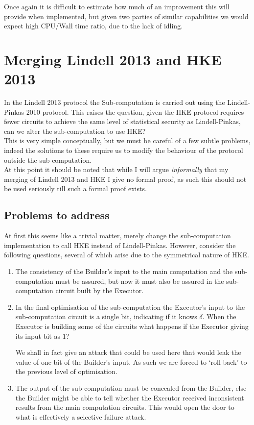 \documentclass[ %
                    author={Nicholas Tutte},
                supervisor={Prof. Nigel Smart},
                    degree={MEng},
                     title={Secure Two Party Computation},
                  subtitle={A practical comparison of recent protocols},
                      type={Research - GG1K},
                      year={2015} ]{dissertation}
\begin{document}
				Once again it is difficult to estimate how much of an improvement this will provide when implemented, but given two parties of similar capabilities we would expect high CPU/Wall time ratio, due to the lack of idling.


		\section{Merging Lindell 2013 and HKE 2013}
			In the Lindell 2013 protocol the Sub-computation is carried out using the Lindell-Pinkas 2010 protocol. This raises the question, given the HKE protocol requires fewer circuits to achieve the same level of statistical security as Lindell-Pinkas, can we alter the sub-computation to use HKE?\\

			This is very simple conceptually, but we must be careful of a few subtle problems, indeed the solutions to these require us to modify the behaviour of the protocol outside the sub-computation.\\

			At this point it should be noted that while I will argue \emph{informally} that my merging of Lindell 2013 and HKE I give no formal proof, as such this should not be used seriously till such a formal proof exists.

			\subsection{Problems to address}
				At first this seems like a trivial matter, merely change the sub-computation implementation to call HKE instead of Lindell-Pinkas. However, consider the following questions, several of which arise due to the symmetrical nature of HKE.

				\begin{enumerate}
					\item The consistency of the Builder's input to the main computation and the sub-computation must be assured, but now it must also be assured in the sub-computation circuit built by the Executor.

					\item In the final optimisation of the sub-computation the Executor's input to the sub-computation circuit is a single bit, indicating if it knows $\delta$. When the Executor is building some of the circuits what happens if the Executor giving its input bit as $1$?

					We shall in fact give an attack that could be used here that would leak the value of one bit of the Builder's input. As such we are forced to `roll back' to the previous level of optimisation.

					\item The output of the sub-computation must be concealed from the Builder, else the Builder might be able to tell whether the Executor received inconsistent results from the main computation circuits. This would open the door to what is effectively a selective failure attack.

				\end{enumerate}
\end{document}
